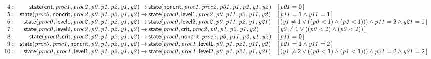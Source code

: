 \documentclass[a4paper]{article}
\newcommand{\symb}[1]{\mathsf{#1}}
\newcommand{\var}[1]{\mathit{#1}}
\newcommand{\Constraint}[1]{[\, #1 \,]}
\begin{document}
\begin{landscape}
\[\begin{array}{rr@{\>}c@{\>}ll}
\mathrm{4} : 
 & \symb{state}(\symb{crit},\var{proc1},\var{proc2},\var{p0},\var{p1},\var{p2},\var{y1},\var{y2})
 & \to 
 & \symb{state}(\symb{noncrit},\var{proc1},\var{proc2},\var{p01},\var{p1},\var{p2},\var{y1},\var{y2})
 & \Constraint{\var{p01} = \symb{0}}\\

\mathrm{5} : 
 & \symb{state}(\var{proc0},\symb{noncrit},\var{proc2},\var{p0},\var{p1},\var{p2},\var{y1},\var{y2})
 & \to 
 & \symb{state}(\var{proc0},\symb{level1},\var{proc2},\var{p0},\var{p11},\var{p2},\var{y11},\var{y2})
 & \Constraint{\var{p11} = \symb{1} \land \var{y11} = \symb{1}}\\

\mathrm{6} : 
 & \symb{state}(\var{proc0},\symb{level1},\var{proc2},\var{p0},\var{p1},\var{p2},\var{y1},\var{y2})
 & \to 
 & \symb{state}(\var{proc0},\symb{level2},\var{proc2},\var{p0},\var{p11},\var{p2},\var{y1},\var{y21})
 & \Constraint{(\var{y1} \ne \symb{1} \lor ((\var{p0} < \symb{1}) \land (\var{p2} < \symb{1}))) \land \var{p11} = \symb{2} \land \var{y21} = \symb{1}}\\

\mathrm{7} : 
 & \symb{state}(\var{proc0},\symb{level2},\var{proc2},\var{p0},\var{p1},\var{p2},\var{y1},\var{y2})
 & \to 
 & \symb{state}(\var{proc0},\symb{crit},\var{proc2},\var{p0},\var{p1},\var{p2},\var{y1},\var{y2})
 & \Constraint{\var{y2} \ne \symb{1} \lor ((\var{p0} < \symb{2}) \land (\var{p2} < \symb{2}))}\\

\mathrm{8} : 
 & \symb{state}(\var{proc0},\symb{crit},\var{proc2},\var{p0},\var{p1},\var{p2},\var{y1},\var{y2})
 & \to 
 & \symb{state}(\var{proc0},\symb{noncrit},\var{proc2},\var{p0},\var{p11},\var{p2},\var{y1},\var{y2})
 & \Constraint{\var{p11} = \symb{0}}\\

\mathrm{9} : 
 & \symb{state}(\var{proc0},\var{proc1},\symb{noncrit},\var{p0},\var{p1},\var{p2},\var{y1},\var{y2})
 & \to 
 & \symb{state}(\var{proc0},\var{proc1},\symb{level1},\var{p0},\var{p1},\var{p21},\var{y11},\var{y2})
 & \Constraint{\var{p21} = \symb{1} \land \var{y11} = \symb{2}}\\

\mathrm{10} : 
 & \symb{state}(\var{proc0},\var{proc1},\symb{level1},\var{p0},\var{p1},\var{p2},\var{y1},\var{y2})
 & \to 
 & \symb{state}(\var{proc0},\var{proc1},\symb{level2},\var{p0},\var{p1},\var{p21},\var{y1},\var{y21})
 & \Constraint{(\var{y1} \ne \symb{2} \lor ((\var{p0} < \symb{1}) \land (\var{p1} < \symb{1}))) \land \var{p21} = \symb{2} \land \var{y21} = \symb{2}}\\


\end{array}\]
\end{landscape}
\end{document}
